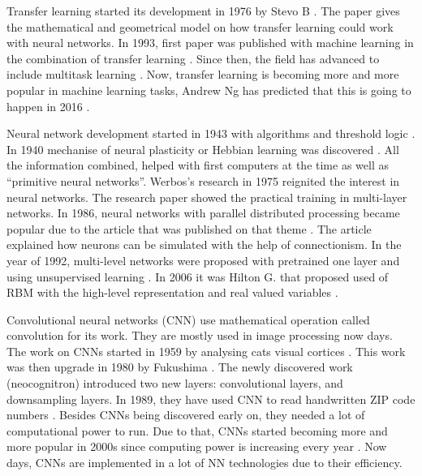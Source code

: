 Transfer learning started its development in 1976 by Stevo B \parencite{bozinovski2020reminder}. The paper gives the mathematical and geometrical model on how transfer learning could work with neural networks. In 1993, first paper was published with machine learning in the combination of transfer learning \parencite{pratt1992discriminability}. Since then, the field has advanced to include multitask learning \parencite{thrun1998learning}. Now, transfer learning is becoming more and more popular in machine learning tasks, Andrew Ng has predicted that this is going to happen in 2016 \parencite{ng2016nuts}.
\newline

Neural network development started in 1943 with algorithms and threshold logic \parencite{mcculloch1943logical}. In 1940 mechanise of neural plasticity or Hebbian learning was discovered \parencite{hebb1940human}. All the information combined, helped with first computers at the time as well as “primitive neural networks”. Werbos’s research in 1975 \parencite{werbos1975experimental} reignited the interest in neural networks. The research paper showed the practical training in multi-layer networks. In 1986, neural networks with parallel distributed processing became popular due to the article that was published on that theme \parencite{rumelhart1986general}. The article explained how neurons can be simulated with the help of connectionism. In the year of 1992, multi-level networks were proposed with pretrained one layer and using unsupervised learning \parencite{schmidhuber1992learning}. In 2006 it was Hilton G. that proposed used of RBM with the high-level representation and real valued variables \parencite{hinton2006reducing}.
\newline

Convolutional neural networks (CNN) use mathematical operation called convolution for its work. They are mostly used in image processing now days. The work on CNNs started in 1959 by analysing cats visual cortices \parencite{hubel1959receptive}. This work was then upgrade in 1980 by Fukushima \parencite{fukushima1982neocognitron}. The newly discovered work (neocognitron) introduced two new layers: convolutional layers, and downsampling layers. In 1989, they have used CNN to read handwritten ZIP code numbers \parencite{lecun1989backpropagation}. Besides CNNs being discovered early on, they needed a lot of computational power to run. Due to that, CNNs started becoming more and more popular in 2000s since computing power is increasing every year \parencite{oh2004gpu}. Now days, CNNs are implemented in a lot of NN technologies due to their efficiency.
\newline

